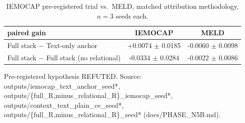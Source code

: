 \begin{table}[t]
\centering
\caption{IEMOCAP pre-registered trial vs.\ MELD, matched attribution methodology, $n{=}3$ seeds each.}
\label{tab:iemocap-decisive}
\begin{tabular}{lcc}
\toprule
paired gain & IEMOCAP & MELD \\
\midrule
Full stack $-$ Text-only anchor & +0.0074 $\pm$ 0.0185 & -0.0060 $\pm$ 0.0098 \\
Full stack $-$ Full stack (no relational) & -0.0334 $\pm$ 0.0284 & -0.0022 $\pm$ 0.0086 \\
\bottomrule
\end{tabular}
\par\footnotesize Pre-registered hypothesis REFUTED. Source: outputs/iemocap\_text\_anchor\_seed*, outputs/\{full\_R,minus\_relational\_R\}\_iemocap\_seed*, outputs/context\_text\_plain\_ce\_seed*, outputs/\{full\_R,minus\_relational\_R\}\_seed* (docs/PHASE\_N5B.md).
\end{table}
